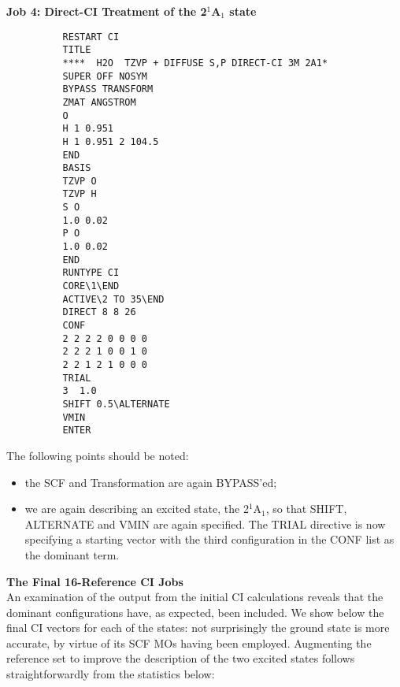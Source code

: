 \documentclass[11pt,fleqn]{article}
\begin{document}
{\bf Job 4: Direct-CI Treatment of the 2$^{1}$A$_{1}$ state}
{
\footnotesize
\begin{verbatim}
          RESTART CI
          TITLE  
          ****  H2O  TZVP + DIFFUSE S,P DIRECT-CI 3M 2A1*
          SUPER OFF NOSYM
          BYPASS TRANSFORM
          ZMAT ANGSTROM
          O
          H 1 0.951
          H 1 0.951 2 104.5
          END
          BASIS 
          TZVP O
          TZVP H
          S O
          1.0 0.02
          P O
          1.0 0.02
          END
          RUNTYPE CI
          CORE\1\END
          ACTIVE\2 TO 35\END
          DIRECT 8 8 26
          CONF
          2 2 2 2 0 0 0 0
          2 2 2 1 0 0 1 0
          2 2 1 2 1 0 0 0
          TRIAL
          3  1.0
          SHIFT 0.5\ALTERNATE
          VMIN
          ENTER
\end{verbatim}
}
The following points should be noted:
\begin{itemize}
\item the SCF and Transformation are again BYPASS'ed;
\item we are again describing an excited state, the 
2$^{1}$A$_{1}$, so that 
SHIFT, ALTERNATE and VMIN are again specified.
The TRIAL directive
is now specifying a starting vector with the third configuration
in the CONF list as the dominant term.
\end{itemize}

{\bf The Final 16-Reference CI Jobs}\\

An examination of the output from the initial CI calculations reveals that
the dominant configurations have, as expected, been included.  We show
below the final CI vectors for each of the states: not surprisingly
the ground state is more accurate, by virtue of its SCF MOs having been
employed. Augmenting the reference set to improve the description of the
two excited states follows straightforwardly from the statistics below: \\
\end{document}
